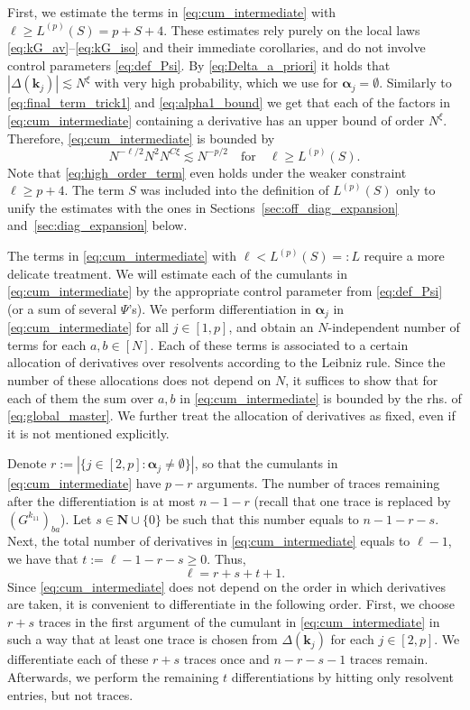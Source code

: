 \documentclass[10pt]{amsart}
\numberwithin{equation}{section}
\newcommand{\nc}{\normalcolor}
\newcommand{\N}{\mathbf{N}}
\begin{document}
First, we estimate the terms in \eqref{eq:cum_intermediate} with $\ell\ge L^{(p)}(S)=p+S+4$. These estimates rely purely on the local laws \eqref{eq:kG_av}--\eqref{eq:kG_iso} and their immediate corollaries, and do not involve control parameters \eqref{eq:def_Psi}. By \eqref{eq:Delta_a_priori} it holds that $|\Delta(\bm{k}_j)|\lesssim N^\xi$ with very high probability, which we use for $\bm{\alpha}_j=\emptyset$. Similarly to \eqref{eq:final_term_trick1} and \eqref{eq:alpha1_bound} we get that each of the factors in \eqref{eq:cum_intermediate} containing a derivative has an upper bound of order $N^\xi$. Therefore, \ref{eq:cum_intermediate} is bounded by
\begin{equation}
N^{-\ell/2} N^2 N^{C \xi} \lesssim N^{-p/2}\quad \text{for}\quad \ell\ge L^{(p)}(S).
\label{eq:high_order_term}
\end{equation}
Note that \eqref{eq:high_order_term} even holds under the weaker constraint $\ell\ge p+4$. The term $S$ was included into the definition of $L^{(p)}(S)$ only to unify the estimates with the ones in Sections~\ref{sec:off_diag_expansion} and~\ref{sec:diag_expansion} below. 

The terms in \eqref{eq:cum_intermediate} with $\ell<L^{(p)}(S)=:L$ require a more delicate treatment. \nc We will estimate each of the cumulants in \eqref{eq:cum_intermediate} by the appropriate control parameter from \eqref{eq:def_Psi} (or a sum of several $\Psi$'s). We perform differentiation in $\bm{\alpha}_j$ in \eqref{eq:cum_intermediate} for all $j\in [1,p]$, and obtain an $N$-independent number of terms for each $a,b\in [N]$.  Each of these terms is associated to a certain allocation of derivatives over resolvents according to the Leibniz rule. Since the number of these allocations does not depend on $N$, it suffices to show that for each of them the sum over $a,b$ in \eqref{eq:cum_intermediate} is bounded by the rhs. of \eqref{eq:global_master}. We further treat the allocation of derivatives as fixed, even if it is not mentioned explicitly.


Denote $r:=|\{j\in [2,p]:\bm{\alpha}_j\neq \emptyset\}|$, so that the cumulants in \eqref{eq:cum_intermediate} have $p-r$ arguments. The number of traces remaining after the differentiation is at most $n-1-r$ (recall that one trace is replaced by $(G^{k_{11}})_{ba}$). Let $s\in\N\cup\{0\}$ be such that this number equals to $n-1-r-s$. Next, the total number of derivatives in \eqref{eq:cum_intermediate} equals to $\ell-1$, we have that $t:=\ell-1-r-s\ge 0$. Thus,
\begin{equation}
\ell=r+s+t+1.
\label{eq:ell_rst}
\end{equation}
Since \eqref{eq:cum_intermediate} does not depend on the order in which derivatives are taken, it is convenient to differentiate in the following order. First, we choose $r+s$ traces in the first argument of the cumulant in \eqref{eq:cum_intermediate} in such a way that at least one trace is chosen from $\Delta(\bm{k}_j)$ for each $j\in [2,p]$. We differentiate each of these $r+s$ traces once and $n-r-s-1$ traces remain. Afterwards, we perform the remaining $t$ differentiations by hitting only resolvent entries, but not traces.  
\end{document}

